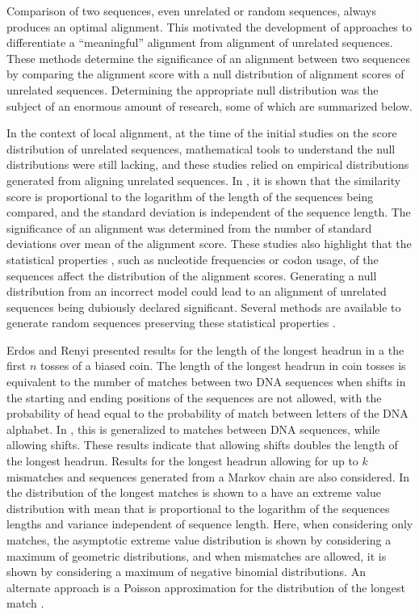 Comparison of two sequences, even unrelated or random sequences, always
produces an optimal alignment. This motivated the development of
approaches to differentiate a ``meaningful'' alignment from alignment of
unrelated sequences. These methods determine the significance of an
alignment between two sequences by comparing the alignment score with a null
distribution of alignment scores of unrelated sequences. Determining the
appropriate null distribution was the subject of an enormous amount of
research, some of which are summarized below.

In the context of local alignment, at the time of the initial studies on
the score distribution of unrelated sequences, mathematical tools to
understand the null distributions were still lacking, and these studies
relied on empirical distributions generated from aligning unrelated
sequences.
In \citep{smith1985statistical}, it is shown that the similarity score is
proportional to the logarithm of the length of the sequences being
compared, and the standard deviation is independent of the sequence
length. The significance of an alignment was determined from the number
of standard deviations over mean of the alignment score.
These studies \citep{lipman1984statistical} also highlight that the
statistical properties \citep{smith1983statistical}, such as nucleotide
frequencies or codon usage, of the sequences affect the distribution of
the alignment scores.  Generating a null distribution from an incorrect
model could lead to an alignment of unrelated sequences being dubiously
declared significant. Several methods are available to generate random
sequences preserving these statistical properties
\citep{fitch1983random,altschul1985significance}.

Erdos and Renyi \citep{erdos1975length} presented results for the length
of the longest headrun in a the first $n$ tosses of a biased coin.  The
length of the longest headrun in coin tosses is equivalent to the number
of matches between two DNA sequences when shifts in the starting and
ending positions of the sequences are not allowed, with the probability
of head equal to the probability of match between letters of the DNA
alphabet.
In \citep{arratia1985erdos}, this is generalized to matches between DNA
sequences, while allowing shifts. These results indicate that allowing
shifts doubles the length of the longest headrun. Results for the
longest headrun allowing for up to $k$ mismatches and sequences
generated from a Markov chain are also considered.
In \citep{arratia1986extreme,gordon1986extreme} the distribution of the
longest matches is shown to a have an extreme value distribution with
mean that is proportional to the logarithm of the sequences lengths and
variance independent of sequence length. Here, when considering only
matches, the asymptotic extreme value distribution is shown by
considering a maximum of geometric distributions, and when mismatches
are allowed, it is shown by considering a maximum of negative binomial
distributions.
An alternate approach is a Poisson approximation for the distribution of
the longest match \citep{arratia1989erdos}.

